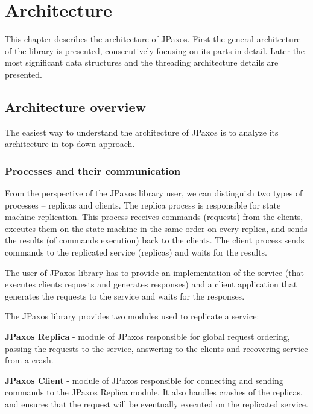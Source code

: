 \chapter{Architecture}

This chapter describes the architecture of JPaxos.
First the general architecture of the library is presented, consecutively focusing on its parts in detail.
Later the most significant data structures and the threading architecture details are presented.

\section{Architecture overview}
\indent\par
The easiest way to understand the architecture of JPaxos is to analyze its architecture in top-down approach.

\subsection{Processes and their communication}

From the perspective of the JPaxos library user, we can distinguish two types of processes -- replicas and clients. The replica process is responsible for state machine replication. This process receives commands (requests) from the clients, executes them on the state machine in the same order on every replica, and sends the results (of commands execution) back to the clients. The client process sends commands to the replicated service (replicas) and waits for the results.

The user of JPaxos library has to provide an implementation of the service (that executes clients requests and generates responses) and a client application that generates the requests to the service and waits for the responses.

The JPaxos library provides two modules used to replicate a service:
\begin{tightList}
  \item[\textbf{JPaxos Replica}] - module of JPaxos responsible for global request ordering, passing the requests to the service, answering to the clients and recovering service from a crash.
  \item[\textbf{JPaxos Client}] - module of JPaxos responsible for connecting and sending commands to the JPaxos Replica module. It also handles crashes of the replicas, and ensures that the request will be eventually executed on the replicated service.
\end{tightList}

